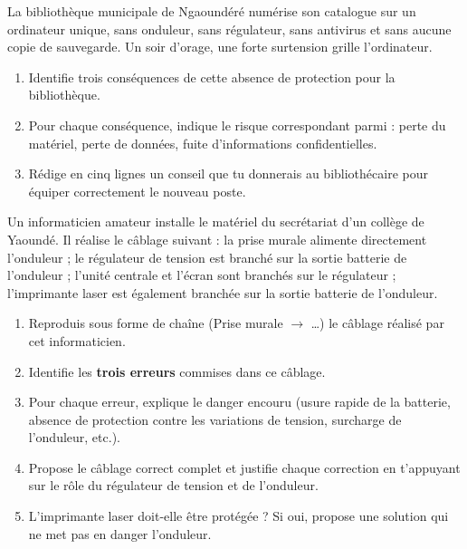 \documentclass[11pt]{article}
\newcounter{popsec}
\newcounter{popsub}
\newcommand{\courssub}[1]{%
  \stepcounter{popsub}%
  \par\vspace{9pt}\noindent{\popxbold\fontsize{11.5}{13}\selectfont\color{popink}{\color{poporange}\thepopsec.\thepopsub}\hspace{6pt}#1}\par\nopagebreak\vspace{4pt}
}
\begin{document}
\begin{exercice}
La bibliothèque municipale de Ngaoundéré numérise son catalogue sur un ordinateur unique, sans onduleur, sans régulateur, sans antivirus et sans aucune copie de sauvegarde. Un soir d'orage, une forte surtension grille l'ordinateur.
\begin{enumerate}
\item Identifie trois conséquences de cette absence de protection pour la bibliothèque.
\item Pour chaque conséquence, indique le risque correspondant parmi : perte du matériel, perte de données, fuite d'informations confidentielles.
\item Rédige en cinq lignes un conseil que tu donnerais au bibliothécaire pour équiper correctement le nouveau poste.
\end{enumerate}
\end{exercice}

\courssub{Je me prépare au Bac}

\begin{exercice}
Un informaticien amateur installe le matériel du secrétariat d'un collège de Yaoundé. Il réalise le câblage suivant : la prise murale alimente directement l'onduleur ; le régulateur de tension est branché sur la sortie batterie de l'onduleur ; l'unité centrale et l'écran sont branchés sur le régulateur ; l'imprimante laser est également branchée sur la sortie batterie de l'onduleur.
\begin{enumerate}
\item Reproduis sous forme de chaîne (Prise murale $\rightarrow$ \ldots) le câblage réalisé par cet informaticien.
\item Identifie les \textbf{trois erreurs} commises dans ce câblage.
\item Pour chaque erreur, explique le danger encouru (usure rapide de la batterie, absence de protection contre les variations de tension, surcharge de l'onduleur, etc.).
\item Propose le câblage correct complet et justifie chaque correction en t'appuyant sur le rôle du régulateur de tension et de l'onduleur.
\item L'imprimante laser doit-elle être protégée ? Si oui, propose une solution qui ne met pas en danger l'onduleur.
\end{enumerate}
\end{exercice}
\end{document}
